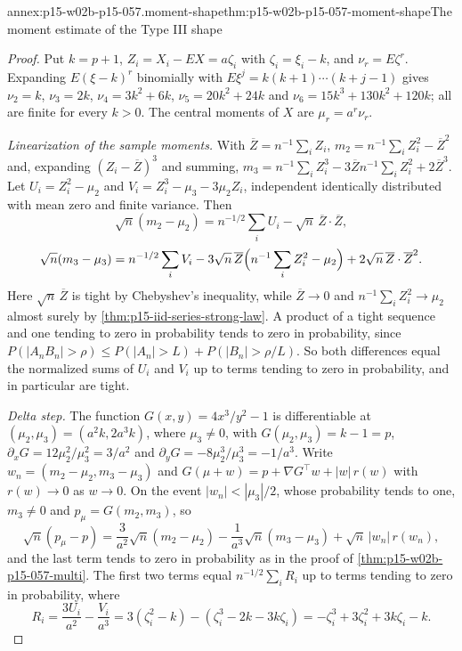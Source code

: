 \begin{annexitem}{annex:p15-w02b-p15-057.moment-shape}{thm:p15-w02b-p15-057-moment-shape}{The moment estimate of the Type III shape}
\begin{proof}
Put \(k=p+1\), \(Z_i=X_i-EX=a\zeta_i\) with \(\zeta_i=\xi_i-k\), and
\(\nu_r=E\zeta^r\). Expanding \(E(\xi-k)^r\) binomially with
\(E\xi^j=k(k+1)\cdots(k+j-1)\) gives
\(\nu_2=k\), \(\nu_3=2k\), \(\nu_4=3k^2+6k\), \(\nu_5=20k^2+24k\) and
\(\nu_6=15k^3+130k^2+120k\); all are finite for every \(k>0\). The
central moments of \(X\) are \(\mu_r=a^r\nu_r\).

\emph{Linearization of the sample moments.} With
\(\overline Z=n^{-1}\sum_iZ_i\),
\(m_2=n^{-1}\sum_iZ_i^2-\overline Z^2\) and, expanding
\((Z_i-\overline Z)^3\) and summing,
\(m_3=n^{-1}\sum_iZ_i^3-3\overline Zn^{-1}\sum_iZ_i^2+2\overline Z^3\).
Let \(U_i=Z_i^2-\mu_2\) and \(V_i=Z_i^3-\mu_3-3\mu_2Z_i\), independent
identically distributed with mean zero and finite variance. Then
\[
 \sqrt n(m_2-\mu_2)=n^{-1/2}\sum_iU_i-\sqrt n\,\overline Z\cdot\overline Z,
\]
\[
 \sqrt n(m_3-\mu_3)=n^{-1/2}\sum_iV_i
 -3\sqrt n\,\overline Z\Bigl(n^{-1}\sum_iZ_i^2-\mu_2\Bigr)
 +2\sqrt n\,\overline Z\cdot\overline Z^2 .
\]
Here \(\sqrt n\,\overline Z\) is tight by Chebyshev's inequality, while
\(\overline Z\to0\) and \(n^{-1}\sum_iZ_i^2\to\mu_2\) almost surely by
\cref{thm:p15-iid-series-strong-law}. A product of a tight sequence and one
tending to zero in probability tends to zero in probability, since
\(P(|A_nB_n|>\rho)\leq P(|A_n|>L)+P(|B_n|>\rho/L)\). So both differences
equal the normalized sums of \(U_i\) and \(V_i\) up to terms tending to
zero in probability, and in particular are tight.

\emph{Delta step.} The function \(G(x,y)=4x^3/y^2-1\) is differentiable at
\((\mu_2,\mu_3)=(a^2k,2a^3k)\), where \(\mu_3\neq0\), with
\(G(\mu_2,\mu_3)=k-1=p\), \(\partial_xG=12\mu_2^2/\mu_3^2=3/a^2\) and
\(\partial_yG=-8\mu_2^3/\mu_3^3=-1/a^3\). Write
\(w_n=(m_2-\mu_2,m_3-\mu_3)\) and
\(G(\mu+w)=p+\nabla G^{\top}w+|w|\,r(w)\) with \(r(w)\to0\) as \(w\to0\).
On the event \(|w_n|<|\mu_3|/2\), whose probability tends to one,
\(m_3\neq0\) and \(p_\mu=G(m_2,m_3)\), so
\[
 \sqrt n(p_\mu-p)=\frac{3}{a^2}\sqrt n(m_2-\mu_2)
 -\frac1{a^3}\sqrt n(m_3-\mu_3)+\sqrt n\,|w_n|\,r(w_n),
\]
and the last term tends to zero in probability as in the proof of
\cref{thm:p15-w02b-p15-057-multi}. The first two terms equal
\(n^{-1/2}\sum_iR_i\) up to terms tending to zero in probability, where
\[
 R_i=\frac{3U_i}{a^2}-\frac{V_i}{a^3}
 =3(\zeta_i^2-k)-(\zeta_i^3-2k-3k\zeta_i)
 =-\zeta_i^3+3\zeta_i^2+3k\zeta_i-k .
\]


\end{proof}
\end{annexitem}

